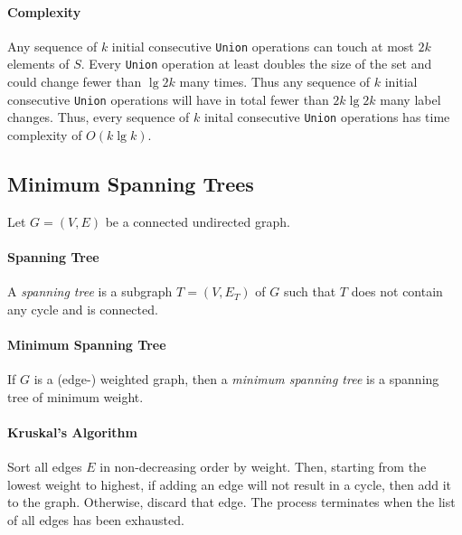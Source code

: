 \paragraph{Complexity}
Any sequence of \(k\) initial consecutive \texttt{Union} operations can touch at most \(2k\)
elements of \(S\). Every \texttt{Union} operation at least doubles the size of the set
and could change fewer than \(\lg 2k\) many times. Thus any sequence of \(k\) initial 
consecutive \texttt{Union} operations will have in total fewer than \(2k \lg 2k\) many
label changes. Thus, every sequence of \(k\) inital consecutive \texttt{Union} operations
has time complexity of \(O(k \lg k)\).

\subsection{Minimum Spanning Trees}
Let \(G = (V, E)\) be a connected undirected graph. 

\paragraph{Spanning Tree} A \textit{spanning tree} is a subgraph \(T=(V, E_T)\) of \(G\)
such that \(T\) does not contain any cycle and is connected.

\paragraph{Minimum Spanning Tree} If \(G\) is a (edge-) weighted graph, then a
\textit{minimum spanning tree} is a spanning tree of minimum weight. 

\paragraph{Kruskal's Algorithm}
Sort all edges \(E\) in non-decreasing order by weight. Then, starting from the lowest weight to
highest, if adding an edge will not result in a cycle, then add it to the graph. Otherwise,
discard that edge. The process terminates when the list of all edges has been exhausted.

